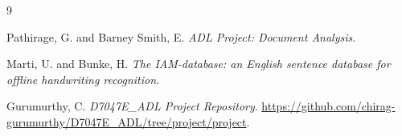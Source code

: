 \documentclass[12pt, a4paper]{article}
\begin{document}
\begin{thebibliography}{9}

Pathirage, G. and Barney Smith, E. \textit{ADL Project: Document Analysis}.

Marti, U. and Bunke, H. \textit{The IAM-database: an English sentence database for offline handwriting recognition.}

Gurumurthy, C. \textit{D7047E\_ADL Project Repository}. \url{https://github.com/chirag-gurumurthy/D7047E_ADL/tree/project/project}.

\end{thebibliography}
\end{document}
